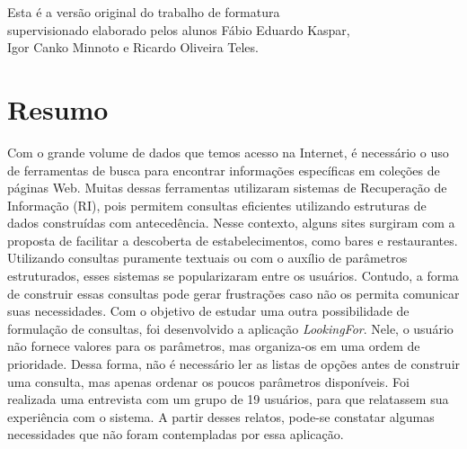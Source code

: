 \documentclass[11pt,oneside,a4paper]{book}
\begin{document}
    \vskip 2cm

    \begin{flushright}
	Esta é a versão original do trabalho de formatura \\ 
    supervisionado elaborado pelos alunos Fábio Eduardo Kaspar,  \\
    Igor Canko Minnoto e Ricardo Oliveira Teles.\\
    \end{flushright}

\pagebreak





 \chapter*{Resumo}


Com o grande volume de dados que temos acesso na Internet, é necessário o uso de ferramentas de busca para encontrar informações específicas em coleções de páginas Web. Muitas dessas ferramentas utilizaram sistemas de Recuperação de Informação (RI), pois permitem consultas eficientes utilizando estruturas de dados construídas com antecedência. Nesse contexto, alguns sites surgiram com a proposta de facilitar a descoberta de estabelecimentos, como bares e restaurantes. Utilizando consultas puramente textuais ou com o auxílio de parâmetros estruturados, esses sistemas se popularizaram entre os usuários. Contudo, a forma de construir essas consultas pode gerar frustrações caso não os permita comunicar suas necessidades. Com o objetivo de estudar uma outra possibilidade de formulação de consultas, foi desenvolvido a aplicação \emph{LookingFor}. Nele, o usuário não fornece valores para os parâmetros, mas organiza-os em uma ordem de prioridade. Dessa forma, não é necessário ler as listas de opções antes de construir uma consulta, mas apenas ordenar os poucos parâmetros disponíveis. Foi realizada uma entrevista com um grupo de 19 usuários, para que relatassem sua experiência com o sistema. A partir desses relatos, pode-se constatar algumas necessidades que não foram contempladas por essa aplicação. \\
\end{document}
